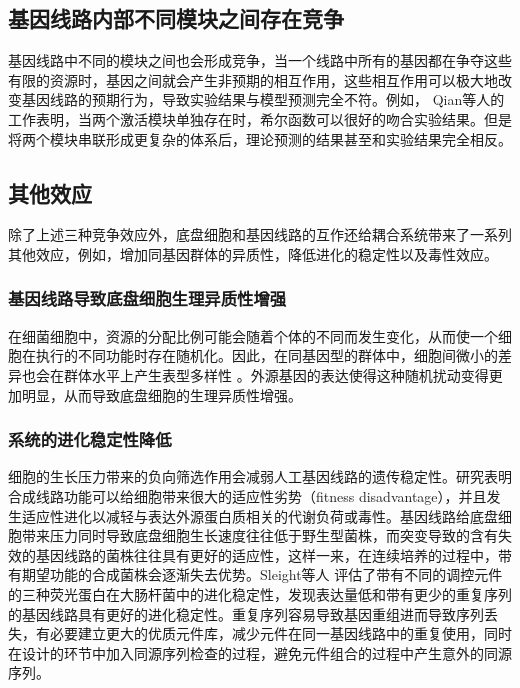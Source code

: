 \documentclass[b5paper,11pt,onecolumn,twoside,UTF8]{article}
\begin{document}
\subsection{基因线路内部不同模块之间存在竞争}
\indent 基因线路中不同的模块之间也会形成竞争\cite{Cookson2011a, 10.1016/j.bpj.2015.06.034}，当一个线路中所有的基因都在争夺这些有限的资源时，基因之间就会产生非预期的相互作用，这些相互作用可以极大地改变基因线路的预期行为，导致实验结果与模型预测完全不符。例如， Qian等人的工作表明，当两个激活模块单独存在时，希尔函数可以很好的吻合实验结果。但是将两个模块串联形成更复杂的体系后，理论预测的结果甚至和实验结果完全相反\cite{Qian2017}。
\subsection{其他效应}
除了上述三种竞争效应外，底盘细胞和基因线路的互作还给耦合系统带来了一系列其他效应，例如，增加同基因群体的异质性，降低进化的稳定性以及毒性效应。%
\subsubsection*{基因线路导致底盘细胞生理异质性增强}
\indent 在细菌细胞中，资源的分配比例可能会随着个体的不同而发生变化，从而使一个细胞在执行的不同功能时存在随机化\cite{thomas2018sources}。因此，在同基因型的群体中，细胞间微小的差异也会在群体水平上产生表型多样性 \cite{kim2020trade}。外源基因的表达使得这种随机扰动变得更加明显，从而导致底盘细胞的生理异质性增强。
\subsubsection*{系统的进化稳定性降低}
细胞的生长压力带来的负向筛选作用会减弱人工基因线路的遗传稳定性。研究表明合成线路功能可以给细胞带来很大的适应性劣势（fitness disadvantage），并且发生适应性进化以减轻与表达外源蛋白质相关的代谢负荷或毒性。基因线路给底盘细胞带来压力同时导致底盘细胞生长速度往往低于野生型菌株，而突变导致的含有失效的基因线路的菌株往往具有更好的适应性，这样一来，在连续培养的过程中，带有期望功能的合成菌株会逐渐失去优势。Sleight等人\cite{Sleight2013} 评估了带有不同的调控元件的三种荧光蛋白在大肠杆菌中的进化稳定性，发现表达量低和带有更少的重复序列的基因线路具有更好的进化稳定性。重复序列容易导致基因重组进而导致序列丢失，有必要建立更大的优质元件库，减少元件在同一基因线路中的重复使用，同时在设计的环节中加入同源序列检查的过程，避免元件组合的过程中产生意外的同源序列。%
\end{document}

